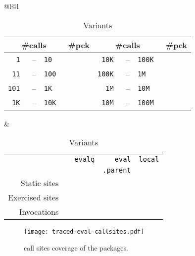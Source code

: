 \documentclass[acmsmall, screen]{acmart}
\renewcommand{\k}[1]{\lstinline |#1|\xspace}
\begin{document}
\begin{table}[H]
\centering
\small

\begin{tabular}{@{\hspace{0.5cm}}l@{\hspace{1.2cm}}l}
\begin{minipage}{5cm}\small
  \begin{tabular}{r@{\,}r@{\,}l@{}r|r@{\,}r@{\,}l@{}r@{}} \toprule
    \multicolumn{3}{c}{\bf \small\#calls} &\bf \small \#pck
&     \multicolumn{3}{c}{\bf \small\#calls} &\bf \small\#pck \\\midrule
\tt 1 &--& \tt 10      & \packageBina  & \tt 10K &--&\tt 100K  & \packageBine\\
\tt 11 &--& \tt 100    & \packageBinb  & \tt 100K &--&\tt 1M  & \packageBinf\\
\tt 101 &--& \tt 1K    & \packageBinc  & \tt 1M &--&\tt 10M   & \packageBing\\
\tt 1K &--& \tt 10K    & \packageBind  & \tt 10M &--& \tt 100M & \packageBinh\\\bottomrule
\end{tabular}\caption{Call frequency}\label{tab:freq}
\end{minipage}
&
\begin{minipage}{8cm}\small
\begin{tabular}{@{}r|rrrr}\toprule
  &\eval & \k{evalq} & \k{eval} & \k{local}\\[-1.3mm]
           & & & \k{.parent} &\\[1.3mm]\midrule
\small Static sites &\packageStaticeval&\packageStaticevalq&\packageStaticevalparent&\packageStaticlocal \\
\small Exercised sites&\packageTriggeredeval&\packageTriggeredevalq&\packageTriggeredevalparent&\packageTriggeredlocal\\
\small Invocations&\packageEvalsRnd&\packageEvalqsRnd&\packageEparentsRnd&\packageLocalsRnd\\\bottomrule
\end{tabular}\caption{Variants}\label{tab:variantseval}
\end{minipage}\end{tabular}
\end{table}

\begin{figure}[h]
	\texttt{[image: traced-eval-callsites.pdf]} \centering
	\caption{\eval call sites coverage of the \PkgPackages packages.}%
	\label{fig:traced-eval-callsites}
\end{figure}
\end{document}
